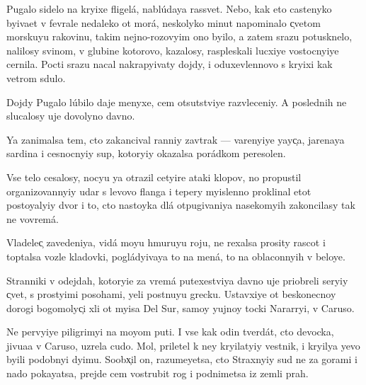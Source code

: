 \documentclass[10pt]{book}
\begin{document}
\newcommand{\X}{X̹}
\newcommand{\x}{x̹}
\newcommand{\C}{C̹}
\renewcommand{\c}{c̹}

\newcommand{\e}{ë}
\newcommand{\yi}{\mbox{y\hspace{-0.55pt}ı}}
\newcommand{\ia}{\mbox{ı\hspace{-0.55pt}a}}
\newcommand{\io}{\mbox{ı\hspace{-0.55pt}o}}
\newcommand{\y}{y̆}
\newcommand{\Y}{Y̆}

\renewcommand{\e}{e}
\renewcommand{\yi}{yi}
\renewcommand{\ia}{á}
\renewcommand{\io}{ú}
\renewcommand{\y}{y}
\renewcommand{\Y}{Y}

Pugalo sidelo na kr{\yi}xe fligel{\ia}, nabl{\io}da{\y}a rassvet. Nebo, kak eto castenyko b{\yi}\-va\-{\y}et v fevrale nedaleko ot mor{\ia}, neskolyko minut napominalo {\c}vetom morsku{\y}u rakovinu, takim nejno-rozov{\yi}m ono b{\yi}lo, a zatem srazu potusknelo, nalilosy svin\-{\c}om, v glubine kotorovo, kazalosy, raspleskali lucxi{\y}e vostocn{\yi}{\y}e cernila. Pocti srazu nacal nakrap{\yi}vaty dojdy, i oduxevl{\e}nnovo s kr{\yi}xi kak vetrom sdulo.

Dojdy Pugalo l{\io}bilo daje menyxe, cem otsutstvi{\y}e razvleceni{\y}. A poslednih ne slucalosy uje dovolyno davno.

{\Y}a zanimalsa tem, cto zakancival ranni{\y} zavtrak — var{\e}n{\yi}{\y}e {\y}a{\y}{\c}a, jarena{\y}a sardina i cesnocn{\yi}{\y} sup, kotor{\yi}{\y} okazalsa por{\ia}dkom peresolen.

Vs{\e} telo cesalosy, noc{\y}u {\y}a otrazil cet{\yi}re ataki klopov, no propustil organi\-zo\-van\-n{\yi}{\y} udar s levovo flanga i tepery m{\yi}slenno proklinal etot posto{\y}al{\yi}{\y} dvor i to, cto nasto{\y}ka dl{\ia} otpugivani{\y}a nasekom{\yi}h zakoncilasy tak ne vovrem{\ia}.

Vladele{\c} zavedeni{\y}a, vid{\ia} mo{\y}u hmuru{\y}u roju, ne rexalsa prosity rascot i toptalsa voz\-le kladovki, pogl{\ia}d{\yi}va{\y}a to na men{\ia}, to na oblaconn{\yi}h v belo{\y}e.

Stranniki v odejdah, ko\-to\-r{\yi}\-{\y}e za vrem{\ia} putexestvi{\y}a davno uje priobreli ser{\yi}{\y} {\c}vet, s prost{\yi}mi posohami, {\y}eli postnu{\y}u grecku. Ustavxi{\y}e ot beskonecno{\y} dorogi bogomoly{\c}i xli ot m{\yi}sa Del Sur, samo{\y} {\y}ujno{\y} tocki Nararr{\yi}, v Caruso.

Ne perv{\yi}{\y}e piligrim{\yi} na mo{\y}om puti. I vse kak odin tverd{\ia}t, cto devocka, ji\-vu\-{\x}a\-{\y}a v Caruso, uzrela cudo. Mol, priletel k ne{\y} kr{\yi}lat{\yi}{\y} vestnik, i kr{\yi}l{\y}a {\y}evo b{\yi}li podobn{\yi} d{\yi}mu. Soob{\x}il on, razume{\y}etsa, cto Straxn{\yi}{\y} sud ne za gorami i nado poka{\y}atsa, prejde cem vostrubit rog i podnimetsa iz zemli prah.
\end{document}
